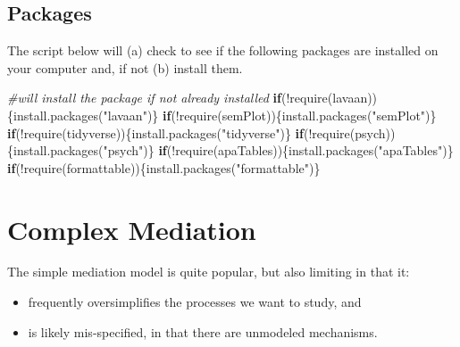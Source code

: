 \documentclass[
  11pt,
]{book}
\newenvironment{Shaded}{\begin{snugshade}}{\end{snugshade}}
\newcommand{\CommentTok}[1]{\textcolor[rgb]{0.56,0.35,0.01}{\textit{#1}}}
\newcommand{\ControlFlowTok}[1]{\textcolor[rgb]{0.13,0.29,0.53}{\textbf{#1}}}
\newcommand{\FunctionTok}[1]{\textcolor[rgb]{0.00,0.00,0.00}{#1}}
\newcommand{\NormalTok}[1]{#1}
\newcommand{\SpecialCharTok}[1]{\textcolor[rgb]{0.00,0.00,0.00}{#1}}
\newcommand{\StringTok}[1]{\textcolor[rgb]{0.31,0.60,0.02}{#1}}
\providecommand{\tightlist}{%
  \setlength{\itemsep}{0pt}\setlength{\parskip}{0pt}}
\begin{document}
\hypertarget{packages-6}{%
\subsection{Packages}\label{packages-6}}

The script below will (a) check to see if the following packages are installed on your computer and, if not (b) install them.

\begin{Shaded}
\begin{Highlighting}[]
\CommentTok{\#will install the package if not already installed}
\ControlFlowTok{if}\NormalTok{(}\SpecialCharTok{!}\FunctionTok{require}\NormalTok{(lavaan))\{}\FunctionTok{install.packages}\NormalTok{(}\StringTok{"lavaan"}\NormalTok{)\}}
\ControlFlowTok{if}\NormalTok{(}\SpecialCharTok{!}\FunctionTok{require}\NormalTok{(semPlot))\{}\FunctionTok{install.packages}\NormalTok{(}\StringTok{"semPlot"}\NormalTok{)\}}
\ControlFlowTok{if}\NormalTok{(}\SpecialCharTok{!}\FunctionTok{require}\NormalTok{(tidyverse))\{}\FunctionTok{install.packages}\NormalTok{(}\StringTok{"tidyverse"}\NormalTok{)\}}
\ControlFlowTok{if}\NormalTok{(}\SpecialCharTok{!}\FunctionTok{require}\NormalTok{(psych))\{}\FunctionTok{install.packages}\NormalTok{(}\StringTok{"psych"}\NormalTok{)\}}
\ControlFlowTok{if}\NormalTok{(}\SpecialCharTok{!}\FunctionTok{require}\NormalTok{(apaTables))\{}\FunctionTok{install.packages}\NormalTok{(}\StringTok{"apaTables"}\NormalTok{)\}}
\ControlFlowTok{if}\NormalTok{(}\SpecialCharTok{!}\FunctionTok{require}\NormalTok{(formattable))\{}\FunctionTok{install.packages}\NormalTok{(}\StringTok{"formattable"}\NormalTok{)\}}
\end{Highlighting}
\end{Shaded}

\hypertarget{complex-mediation}{%
\section{Complex Mediation}\label{complex-mediation}}

The simple mediation model is quite popular, but also limiting in that it:

\begin{itemize}
\tightlist
\item
  frequently oversimplifies the processes we want to study, and
\item
  is likely mis-specified, in that there are unmodeled mechanisms.
\end{itemize}
\end{document}
